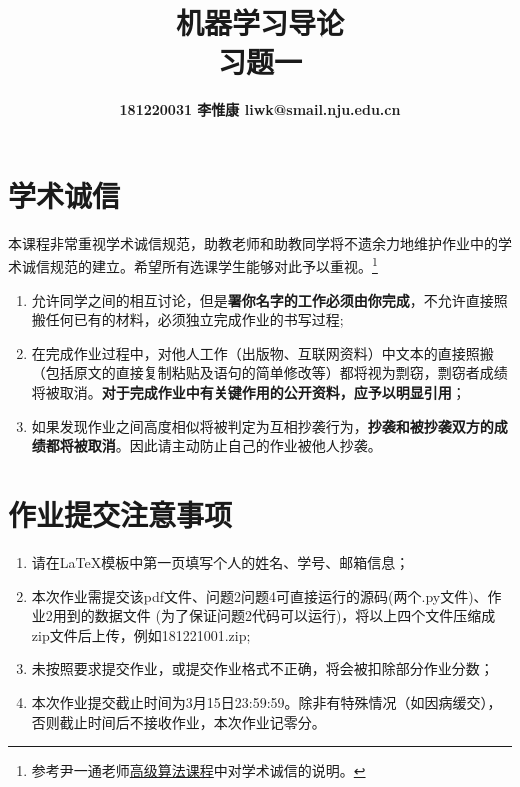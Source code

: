 \documentclass[a4paper,UTF8]{article}
\theoremstyle{definition}
\begin{document}
\title{\textbf{机器学习导论\\习题一}}
\author{\textbf{181220031 李惟康 liwk@smail.nju.edu.cn}}
\maketitle


\section*{学术诚信}

本课程非常重视学术诚信规范，助教老师和助教同学将不遗余力地维护作业中的学术诚信规范的建立。希望所有选课学生能够对此予以重视。\footnote{参考尹一通老师\href{http://tcs.nju.edu.cn/wiki/}{高级算法课程}中对学术诚信的说明。}

\begin{tcolorbox}
	\begin{enumerate}
		\item[(1)] 允许同学之间的相互讨论，但是{\color{red}\textbf{署你名字的工作必须由你完成}}，不允许直接照搬任何已有的材料，必须独立完成作业的书写过程;
		\item[(2)] 在完成作业过程中，对他人工作（出版物、互联网资料）中文本的直接照搬（包括原文的直接复制粘贴及语句的简单修改等）都将视为剽窃，剽窃者成绩将被取消。{\color{red}\textbf{对于完成作业中有关键作用的公开资料，应予以明显引用}}；
		\item[(3)] 如果发现作业之间高度相似将被判定为互相抄袭行为，{\color{red}\textbf{抄袭和被抄袭双方的成绩都将被取消}}。因此请主动防止自己的作业被他人抄袭。
	\end{enumerate}
\end{tcolorbox}

\section*{作业提交注意事项}
\begin{tcolorbox}
	\begin{enumerate}
		\item[(1)] 请在LaTeX模板中第一页填写个人的姓名、学号、邮箱信息；
		\item[(2)] 本次作业需提交该pdf文件、问题2问题4可直接运行的源码(两个.py文件)、作业2用到的数据文件 (为了保证问题2代码可以运行)，将以上四个文件压缩成zip文件后上传，例如181221001.zip;
		\item[(3)] 未按照要求提交作业，或提交作业格式不正确，将会被扣除部分作业分数；
		\item[(4)] 本次作业提交截止时间为3月15日23:59:59。除非有特殊情况（如因病缓交），否则截止时间后不接收作业，本次作业记零分。
	\end{enumerate}
\end{tcolorbox}
\end{document}

